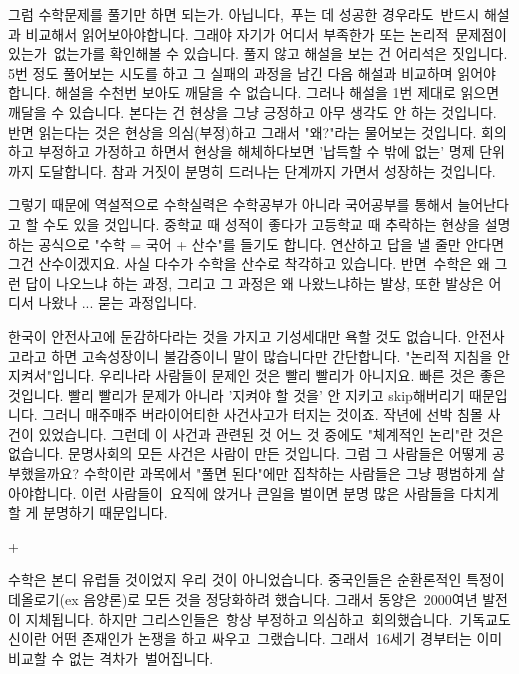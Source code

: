 그럼 수학문제를 풀기만 하면 되는가. 아닙니다, 푸는 데 성공한 경우라도 반드시 해설과 비교해서 읽어보아야합니다.
그래야 자기가 어디서 부족한가 또는 논리적 문제점이 있는가 없는가를 확인해볼 수 있습니다.
풀지 않고 해설을 보는 건 어리석은 짓입니다.
5번 정도 풀어보는 시도를 하고 그 실패의 과정을 남긴 다음 해설과 비교하며 읽어야 합니다.
해설을 수천번 보아도 깨달을 수 없습니다. 그러나 해설을 1번 제대로 읽으면 깨달을 수 있습니다.
본다는 건 현상을 그냥 긍정하고 아무 생각도 안 하는 것입니다.
반면 읽는다는 것은 현상을 의심(부정)하고 그래서 "왜?"라는 물어보는 것입니다.
회의하고 부정하고 가정하고 하면서 현상을 해체하다보면 '납득할 수 밖에 없는' 명제 단위까지 도달합니다.
참과 거짓이 분명히 드러나는 단계까지 가면서 성장하는 것입니다.
\vspace{5mm}

그렇기 때문에 역설적으로 수학실력은 수학공부가 아니라 국어공부를 통해서 늘어난다고 할 수도 있을 것입니다.
중학교 때 성적이 좋다가 고등학교 때 추락하는 현상을 설명하는 공식으로 "수학 = 국어 + 산수"를 들기도 합니다.
연산하고 답을 낼 줄만 안다면 그건 산수이겠지요. 사실 다수가 수학을 산수로 착각하고 있습니다.
반면 수학은 왜 그런 답이 나오느냐 하는 과정, 그리고 그 과정은 왜 나왔느냐하는 발상, 또한 발상은 어디서 나왔나 ... 묻는 과정입니다.
\vspace{5mm}

한국이 안전사고에 둔감하다라는 것을 가지고 기성세대만 욕할 것도 없습니다.
안전사고라고 하면 고속성장이니 불감증이니 말이 많습니다만 간단합니다. "논리적 지침을 안 지켜서"입니다.
우리나라 사람들이 문제인 것은 빨리 빨리가 아니지요. 빠른 것은 좋은 것입니다.
빨리 빨리가 문제가 아니라 '지켜야 할 것을' 안 지키고 skip해버리기 때문입니다. 그러니 매주매주 버라이어티한 사건사고가 터지는 것이죠.
작년에 선박 침몰 사건이 있었습니다. 그런데 이 사건과 관련된 것 어느 것 중에도 "체계적인 논리"란 것은 없습니다.
문명사회의 모든 사건은 사람이 만든 것입니다. 그럼 그 사람들은 어떻게 공부했을까요?
수학이란 과목에서 "풀면 된다"에만 집착하는 사람들은 그냥 평범하게 살아야합니다.
이런 사람들이 요직에 앉거나 큰일을 벌이면 분명 많은 사람들을 다치게 할 게 분명하기 때문입니다.
\vspace{5mm}

+
\vspace{5mm}

수학은 본디 유럽들 것이었지 우리 것이 아니었습니다.
중국인들은 순환론적인 특정이데올로기(ex 음양론)로 모든 것을 정당화하려 했습니다. 그래서 동양은 2000여년 발전이 지체됩니다.
하지만 그리스인들은 항상 부정하고 의심하고 회의했습니다. 기독교도 신이란 어떤 존재인가 논쟁을 하고 싸우고 그랬습니다.
그래서 16세기 경부터는 이미 비교할 수 없는 격차가 벌어집니다.
\vspace{5mm}

